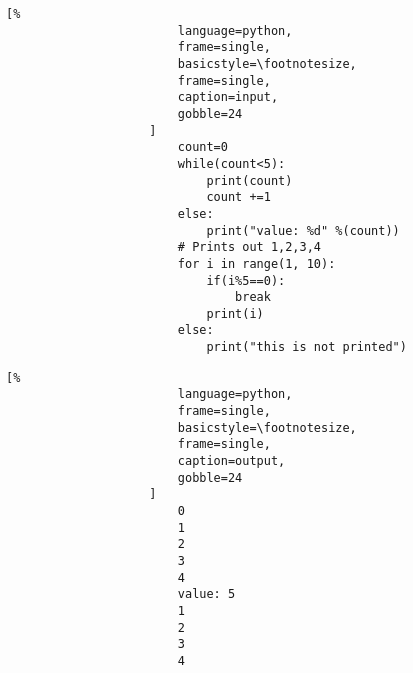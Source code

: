 \documentclass[crop=false,class=book]{standalone}
\begin{document}
                \begin{minipage}[t]{.48\textwidth}
                    \centering
                    \begin{lstlisting}[%
                        language=python,
                        frame=single,
                        basicstyle=\footnotesize,
                        frame=single,
                        caption=input,
                        gobble=24
                    ]
                        count=0
                        while(count<5):
                            print(count)
                            count +=1
                        else:
                            print("value: %d" %(count))
                        # Prints out 1,2,3,4
                        for i in range(1, 10):
                            if(i%5==0):
                                break
                            print(i)
                        else:
                            print("this is not printed")
                    \end{lstlisting}
                \end{minipage}\hfill
                \begin{minipage}[t]{.48\textwidth}
                    \centering
                    \begin{lstlisting}[%
                        language=python,
                        frame=single,
                        basicstyle=\footnotesize,
                        frame=single,
                        caption=output,
                        gobble=24
                    ]
                        0
                        1
                        2
                        3
                        4
                        value: 5
                        1
                        2
                        3
                        4
                    \end{lstlisting}
                \end{minipage}
\end{document}
